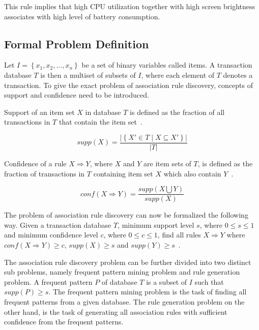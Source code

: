 This rule implies that high CPU utilization together with high screen brightness associates with high level of battery consumption.

\subsection{Formal Problem Definition}

Let $I = \left\{ x_1, x_2, ..., x_n \right\}$ be a set of binary variables called items. A transaction database $T$ is then a multiset of subsets of $I$, where each element of $T$ denotes a transaction. To give the exact problem of association rule discovery, concepts of support and confidence need to be introduced.

Support of an item set $X$ in database $T$ is defined as the fraction of all transactions in $T$ that contain the item set~\cite{Hipp:2000:AAR:360402.360421}.

\[ supp(X) = \dfrac{ \vert \left\{ X' \in T  \mid X \subseteq X'  \right\}  \vert }{ \vert T \vert  } \]

Confidence of a rule $X \Rightarrow Y$, where $X$ and $Y$ are item sets of $T$, is defined as the fraction of transactions in $T$ containing item set $X$ which also contain $Y$~\cite{Hipp:2000:AAR:360402.360421}.

\[conf( X \Rightarrow Y) = \dfrac{ supp( X \bigcup Y ) }{ supp(X) } \]

The problem of association rule discovery can now be formalized the following way. Given a transaction database $T$, minimum support level $s$, where $ 0 \leq s \leq 1 $ and minimum confidence level $c$, where $ 0 \leq c \leq 1 $, find all rules $X \Rightarrow Y$ where $conf( X \Rightarrow Y ) \geq c$, $supp(X) \geq s$ and $supp(Y) \geq s$~\cite{Hipp:2000:AAR:360402.360421}. 

The association rule discovery problem can be further divided into two distinct sub problems, namely frequent pattern mining problem and rule generation problem. A frequent pattern $P$ of database $T$ is a subset of $I$ such that $supp(P) \geq s$. The frequent pattern mining problem is the task of finding all frequent patterns from a given database. The rule generation problem on the other hand, is the task of generating all association rules with sufficient confidence from the frequent patterns. 

